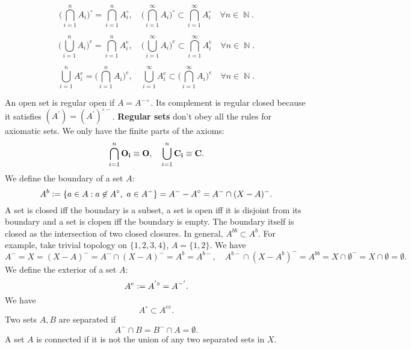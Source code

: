 \documentclass{article}
\DeclareMathOperator\N{\mathbb{N}}
\begin{document}
$$
\big( \bigcap_{i=1}^n A_i \big)^\circ = \bigcap_{i=1}^n A_i^\circ, \quad \big( \bigcap_{i=1}^\infty A_i \big)^\circ \subset \bigcap_{i=1}^\infty A_i^\circ \quad \forall n \in \N.
$$


$$
\big( \bigcup_{i=1}^n A_i \big)^e = \bigcap_{i=1}^n A_i^e, \quad \big( \bigcup_{i=1}^\infty A_i \big)^e \subset \bigcap_{i=1}^\infty A_i^e \quad \forall n \in \N.
$$


$$
\bigcup_{i=1}^n A_i^e = \big( \bigcap_{i=1}^n A_i \big)^e, \quad \bigcup_{i=1}^\infty A_i^e \subset \big( \bigcap_{i=1}^\infty A_i \big)^e \quad \forall n \in \N.
$$


An open set is regular open if $A=A^{-\circ}$.
Its complement is regular closed because it satisfies
$(A^{'}) = (A^{'})^{\circ -}$. \textbf{Regular sets} don't obey all the rules for axiomatic sets.
We only have the finite parts of the axioms: $$
\bigcap_{i=1}^{n} {\bf O_i} \equiv {\bf O}, \quad \bigcup_{i=1}^n { \bf C_i} \equiv {\bf C}.
$$
We define the boundary of a set $A$:
$$
A^b \vcentcolon= \{a \in A: a \not \in A^\circ, \,\, a \in A^- \} = A^- - A^\circ = A^- \cap (X-A)^-.
$$
A set is closed iff the boundary is a subset, a set is open iff it is disjoint from its boundary and
a set is clopen iff the boundary is empty. The boundary itself is closed as the intersection of two closed closures. In general, $A^{bb} \subset A^b$. For example,
take trivial topology on $\{1,2,3,4\}$, $A=\{1,2\}$. We have $$
A^- = X = (X-A)^- = A^- \cap (X-A)^- = A^b = A^{b-}, \quad A^{b-} \cap (X-A^{b})^- = A^{bb} = X \cap \emptyset^- = X \cap \emptyset = \emptyset.
$$
We define the exterior of a set $A$:
$$
A^e \vcentcolon= A^{'\circ} = A^{-'}.
$$
We have $$
A^\circ \subset A^{ee}.
$$
Two sets $A,B$ are separated if $$
A^- \cap B = B^- \cap A = \emptyset.
$$
A set $A$ is connected if it is not the union of any two separated sets in $X$.
\subsubsection{}


\subsubsection{}


\subsubsection{}

\subsubsection{}
\end{document}

